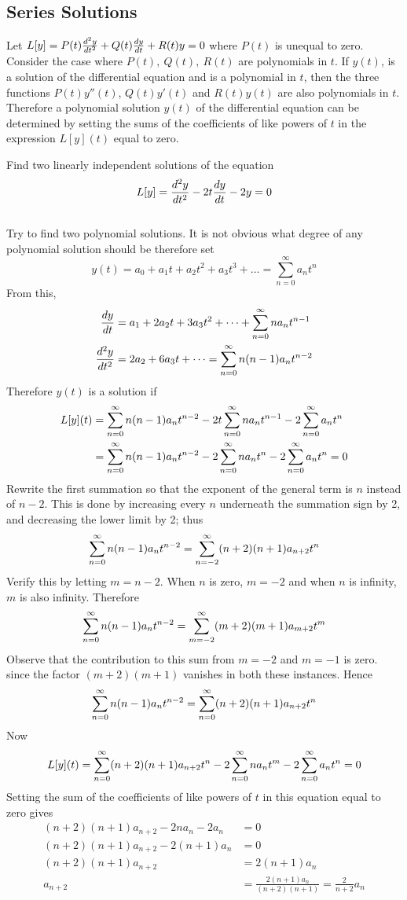 \documentclass[12pt]{article}
\begin{document}
\subsection{Series Solutions} 
Let $L[y] = P(t)\frac{d^2y}{dt^2} + Q(t)\frac{dy}{dt} + R(t)y = 0$ where $P(t)$ is unequal to zero. Consider the case where $P(t), ~ Q(t), ~R(t)$ are polynomials in $t$. If $y(t)$, is a solution of the differential equation and is a polynomial in $t$, then the three functions $P(t)y''(t)$, $Q(t)y'(t)$ and $R(t)y(t)$ are also polynomials in $t$. Therefore a polynomial solution $y(t)$ of the differential equation can be determined by setting the sums of the coefficients of like powers of $t$ in the expression $L[y](t)$ equal to zero. 

\begin{example} Find two linearly independent solutions of the equation $$L[y] = \frac{d^2y}{dt^2} - 2t\frac{dy}{dt} - 2y = 0$$ \\ Try to find two polynomial solutions. It is not obvious what degree of any polynomial solution should be therefore set $$y(t) = a_0 + a_1t + a_2t^2 + a_3t^3 + \dots = \sum_{n = 0}^{\infty} a_nt^n $$ From this, $$\begin{aligned} \frac{dy}{dt} &= a_1 + 2a_2t + 3a_3t^2 + \dots + \sum_{n = 0}^{\infty} na_nt^{n - 1} \\ \frac{d^2y}{dt^2} &= 2a_2 + 6a_3t + \dots = \sum_{n = 0}^{\infty} n(n - 1)a_nt^{n - 2} \end{aligned} $$ 
Therefore $y(t)$ is a solution if $$\begin{aligned} L[y](t) &= \sum_{n = 0}^{\infty} n(n - 1)a_nt^{n - 2} - 2t\sum_{n = 0}^{\infty} na_nt^{n - 1} - 2\sum_{n = 0}^{\infty} a_nt^n \\ &= \sum_{n = 0}^{\infty} n(n - 1)a_nt^{n - 2} - 2\sum_{n = 0}^{\infty} na_nt^n - 2\sum_{n = 0}^{\infty} a_nt^n = 0 \end{aligned} $$ 
Rewrite the first summation so that the exponent of the general term is $n$ instead of $n - 2$. This is done by increasing every $n$ underneath the summation sign by 2, and decreasing the lower limit by 2; thus $$\sum_{n = 0}^{\infty} n(n - 1)a_nt^{n- 2} = \sum_{n = -2}^{\infty} (n + 2)(n + 1)a_{n + 2}t^n $$ 
Verify this by letting $m = n - 2$. When $n$ is zero, $m = -2$ and when $n$ is infinity, $m$ is also infinity. Therefore $$\sum_{n = 0}^{\infty} n(n - 1)a_nt^{n - 2} = \sum_{m = -2}^{\infty} (m + 2)(m + 1)a_{m + 2}t^m $$ Observe that the contribution to this sum from $m = -2$ and $m = -1$ is zero. since the factor $(m + 2)(m + 1)$ vanishes in both these instances. Hence $$\sum_{n = 0}^{\infty} n(n - 1)a_nt^{n - 2} = \sum_{n = 0}^{\infty} (n + 2)(n + 1)a_{n + 2}t^n$$ Now $$L[y](t) = \sum_{n = 0}^{\infty} (n + 2)(n + 1)a_{n + 2}t^n - 2\sum_{n = 0}^{\infty} na_nt^m - 2\sum_{n = 0}^{\infty} a_nt^n = 0$$ Setting the sum of the coefficients of like powers of $t$ in this equation equal to zero gives $$\begin{aligned}  (n + 2)(n + 1)a_{n + 2} - 2na_n - 2a_n &= 0 \\ (n + 2)(n + 1)a_{n + 2} - 2(n + 1)a_n &= 0 \\ (n + 2)(n + 1)a_{n + 2} &= 2(n + 1)a_n \\ a_{n + 2} &= \frac{2(n + 1)a_n}{(n + 2)(n + 1)} = \frac{2}{n + 2}a_n \end{aligned} $$ 

\end{example}
\end{document}
